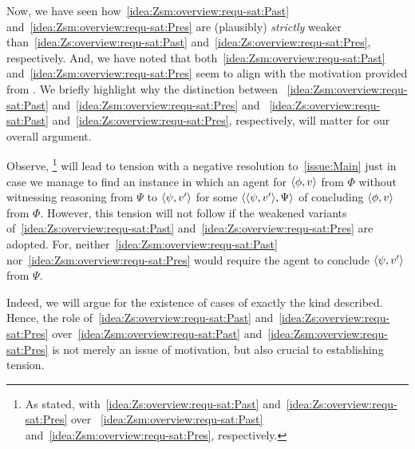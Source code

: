 \begin{note}
  Now, we have seen how~\ref{idea:Zsm:overview:requ-sat:Past} and~\ref{idea:Zsm:overview:requ-sat:Pres} are (plausibly) \emph{strictly} weaker than~\ref{idea:Zs:overview:requ-sat:Past} and~\ref{idea:Zs:overview:requ-sat:Pres}, respectively.
  And, we have noted that both~\ref{idea:Zsm:overview:requ-sat:Past} and~\ref{idea:Zsm:overview:requ-sat:Pres} seem to align with the motivation provided from \csN{}.
  We briefly highlight why the distinction between ~\ref{idea:Zsm:overview:requ-sat:Past} and~\ref{idea:Zsm:overview:requ-sat:Pres} and ~\ref{idea:Zs:overview:requ-sat:Past} and~\ref{idea:Zs:overview:requ-sat:Pres}, respectively, will matter for our overall argument.

  Observe, \csN{}%
  \footnote{
    As stated, with~\ref{idea:Zs:overview:requ-sat:Past} and~\ref{idea:Zs:overview:requ-sat:Pres} over ~\ref{idea:Zsm:overview:requ-sat:Past} and~\ref{idea:Zsm:overview:requ-sat:Pres}, respectively.
  }
  will lead to tension with a negative resolution to~\autoref{issue:Main} just in case we manage to find an instance in which an agent \csN{} for \(\langle \phi, v \rangle\) from \(\Phi\) without witnessing reasoning from \(\Psi\) to \(\langle \psi, v' \rangle\) for some \requ{} \(\langle \langle \psi, v' \rangle, \Psi \rangle\) of concluding \(\langle \phi, v \rangle\) from \(\Phi\).
  However, this tension will not follow if the weakened variants of~\ref{idea:Zs:overview:requ-sat:Past} and~\ref{idea:Zs:overview:requ-sat:Pres} are adopted.
  For, neither~\ref{idea:Zsm:overview:requ-sat:Past} nor~\ref{idea:Zsm:overview:requ-sat:Pres} would require the agent to conclude \(\langle \psi, v' \rangle\) from \(\Psi\).

  Indeed, we will argue for the existence of cases of exactly the kind described.
  Hence, the role of~\ref{idea:Zs:overview:requ-sat:Past} and~\ref{idea:Zs:overview:requ-sat:Pres} over~\ref{idea:Zsm:overview:requ-sat:Past} and~\ref{idea:Zsm:overview:requ-sat:Pres} is not merely an issue of motivation, but also crucial to establishing tension.
\end{note}

